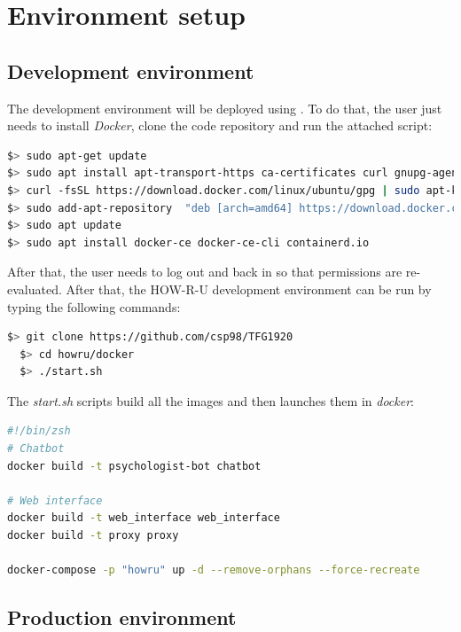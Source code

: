 \documentclass[12pt,english]{article}
\begin{document}
\section{Environment setup}
\label{sec:env_setup}

\subsection{Development environment}

The development environment will be deployed using \cite{docker}. To do that, the user just needs to install \emph{Docker}, clone the code repository and run the attached script:

\begin{lstlisting}[language=bash, caption={Commands to install Docker}, captionpos=b, mathescape=false]
$> sudo apt-get update
$> sudo apt install apt-transport-https ca-certificates curl gnupg-agent software-properties-common
$> curl -fsSL https://download.docker.com/linux/ubuntu/gpg | sudo apt-key add -
$> sudo add-apt-repository  "deb [arch=amd64] https://download.docker.com/linux/ubuntu $(lsb_release -cs) stable"
$> sudo apt update
$> sudo apt install docker-ce docker-ce-cli containerd.io
\end{lstlisting}

After that, the user needs to log out and back in so that permissions are re-evaluated. After that, the HOW-R-U development environment can be run by typing the following commands:

\begin{lstlisting}[mathescape=false, language=bash, caption={Commands to deploy development environment}, captionpos=b]
  $> git clone https://github.com/csp98/TFG1920
  $> cd howru/docker
  $> ./start.sh
\end{lstlisting}

The \emph{start.sh} scripts build all the images and then launches them in \emph{docker}:

\begin{lstlisting}[language=bash, caption={start.sh script}, captionpos=b]
#!/bin/zsh
# Chatbot
docker build -t psychologist-bot chatbot

# Web interface
docker build -t web_interface web_interface
docker build -t proxy proxy

docker-compose -p "howru" up -d --remove-orphans --force-recreate
\end{lstlisting}

\newpage
\subsection{Production environment}
\end{document}
